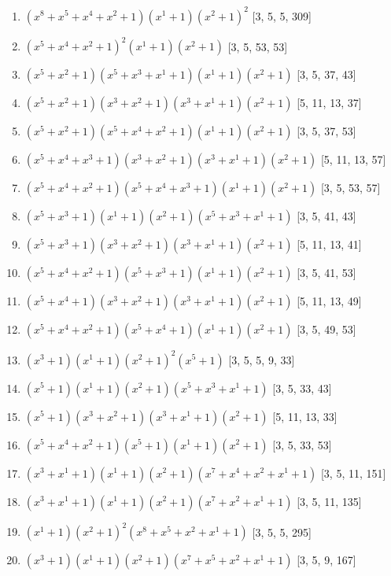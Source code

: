 \documentclass[10pt,twocolumn]{article}
\begin{document}
\begin{enumerate}
\item $(x^{8} + x^{5} + x^{4} + x^{2} + 1)(x^{1} + 1)(x^{2} + 1)^{2}$  [3, 5, 5, 309]
\item $(x^{5} + x^{4} + x^{2} + 1)^{2}(x^{1} + 1)(x^{2} + 1)$  [3, 5, 53, 53]
\item $(x^{5} + x^{2} + 1)(x^{5} + x^{3} + x^{1} + 1)(x^{1} + 1)(x^{2} + 1)$  [3, 5, 37, 43]
\item $(x^{5} + x^{2} + 1)(x^{3} + x^{2} + 1)(x^{3} + x^{1} + 1)(x^{2} + 1)$  [5, 11, 13, 37]
\item $(x^{5} + x^{2} + 1)(x^{5} + x^{4} + x^{2} + 1)(x^{1} + 1)(x^{2} + 1)$  [3, 5, 37, 53]
\item $(x^{5} + x^{4} + x^{3} + 1)(x^{3} + x^{2} + 1)(x^{3} + x^{1} + 1)(x^{2} + 1)$  [5, 11, 13, 57]
\item $(x^{5} + x^{4} + x^{2} + 1)(x^{5} + x^{4} + x^{3} + 1)(x^{1} + 1)(x^{2} + 1)$  [3, 5, 53, 57]
\item $(x^{5} + x^{3} + 1)(x^{1} + 1)(x^{2} + 1)(x^{5} + x^{3} + x^{1} + 1)$  [3, 5, 41, 43]
\item $(x^{5} + x^{3} + 1)(x^{3} + x^{2} + 1)(x^{3} + x^{1} + 1)(x^{2} + 1)$  [5, 11, 13, 41]
\item $(x^{5} + x^{4} + x^{2} + 1)(x^{5} + x^{3} + 1)(x^{1} + 1)(x^{2} + 1)$  [3, 5, 41, 53]
\item $(x^{5} + x^{4} + 1)(x^{3} + x^{2} + 1)(x^{3} + x^{1} + 1)(x^{2} + 1)$  [5, 11, 13, 49]
\item $(x^{5} + x^{4} + x^{2} + 1)(x^{5} + x^{4} + 1)(x^{1} + 1)(x^{2} + 1)$  [3, 5, 49, 53]
\item $(x^{3} + 1)(x^{1} + 1)(x^{2} + 1)^{2}(x^{5} + 1)$  [3, 5, 5, 9, 33]
\item $(x^{5} + 1)(x^{1} + 1)(x^{2} + 1)(x^{5} + x^{3} + x^{1} + 1)$  [3, 5, 33, 43]
\item $(x^{5} + 1)(x^{3} + x^{2} + 1)(x^{3} + x^{1} + 1)(x^{2} + 1)$  [5, 11, 13, 33]
\item $(x^{5} + x^{4} + x^{2} + 1)(x^{5} + 1)(x^{1} + 1)(x^{2} + 1)$  [3, 5, 33, 53]
\item $(x^{3} + x^{1} + 1)(x^{1} + 1)(x^{2} + 1)(x^{7} + x^{4} + x^{2} + x^{1} + 1)$  [3, 5, 11, 151]
\item $(x^{3} + x^{1} + 1)(x^{1} + 1)(x^{2} + 1)(x^{7} + x^{2} + x^{1} + 1)$  [3, 5, 11, 135]
\item $(x^{1} + 1)(x^{2} + 1)^{2}(x^{8} + x^{5} + x^{2} + x^{1} + 1)$  [3, 5, 5, 295]
\item $(x^{3} + 1)(x^{1} + 1)(x^{2} + 1)(x^{7} + x^{5} + x^{2} + x^{1} + 1)$  [3, 5, 9, 167]

\end{enumerate}
\end{document}

